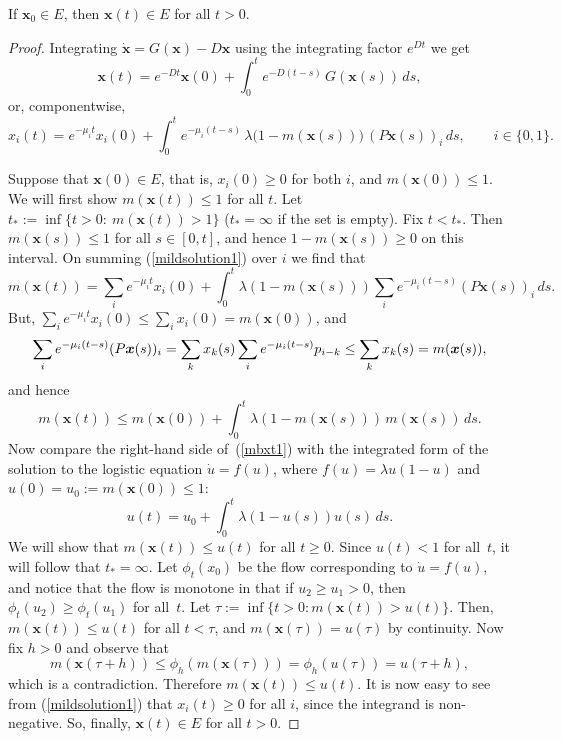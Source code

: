 \documentclass[10pt,a4paper]{amsart}
\newcommand{\bx}{\boldsymbol{x}}
\begin{document}
\begin{theorem}
If $\bx_0\in E$, then $\bx(t)\in E$ for all $t>0$.
\end{theorem}

\begin{proof}
Integrating $\dot{\bx}=G(\bx) - D\bx$ using the integrating factor
$e^{Dt}$ we get
$$
\bx(t)=e^{-D t}\bx(0)+\int_0^t e^{-D(t-s)}\,G(\bx(s))\,ds,
$$
or, componentwise,
\begin{equation}
x_i(t)=e^{-\mu_i t}x_i(0)+\int_0^t
e^{-\mu_i(t-s)}\,\lambda\bigl(1-m(\bx(s))\bigr)\, (P\bx(s))_i\,ds,
\qquad i\in \{0,1\}.
\label{mildsolution1}
\end{equation}

Suppose that $\bx(0)\in E$, that is, 
$x_i(0)\geq 0$ for both $i$, and $m(\bx(0))\leq 1$.
We will first show $m(\bx(t))\leq 1$ for all $t$.
Let $t_*:=\inf\{t>0:\ m(\bx(t))>1\}$ 
($t_*=\infty$ if the set is empty).
Fix $t<t_*$. Then $m(\bx(s))\le 1$ for all $s\in[0,t]$, and hence 
$1-m(\bx(s))\geq 0$ on this interval. 
On summing (\ref{mildsolution1}) over $i$ we find that 
\[
m(\bx(t))=\sum_i e^{-\mu_i t}x_i(0)
+\int_0^t \lambda(1-m(\bx(s)))\sum_i e^{-\mu_i(t-s)}(P\bx(s))_i\,ds.
\]
But, $\sum_i e^{-\mu_i t}x_i(0)\le \sum_i x_i(0)=m(\bx(0))$, and
$$
\sum_i e^{-\mu_i(t-s)}(P\bx(s))_i
=\sum_k x_k(s)\sum_i e^{-\mu_i(t-s)}p_{i-k}\\
\leq \sum_k x_k(s)=m(\bx(s)),
$$
and hence 
\begin{equation}
m(\bx(t))\le m(\bx(0))+\int_0^t \lambda(1-m(\bx(s)))\,m(\bx(s))\,ds.
\label{mbxt1}
\end{equation}
Now compare the right-hand side of~(\ref{mbxt1}) with the
integrated form of the solution to the
logistic equation $\dot{u}=f(u)$, where $f(u)=\lambda u(1-u)$ and 
$u(0)=u_0:=m(\bx(0))\le 1$:
$$
u(t) = u_0 + \int_0^t \lambda (1-u(s)) u(s)\, ds.
$$
We will show that $m(\bx(t))\leq u(t)$ for all $t\geq 0$. 
Since $u(t)<1$ for all~$t$, it will follow that $t_*=\infty$. 
Let $\phi_t(x_0)$ be the flow corresponding to $\dot{u}=f(u)$,
and notice that the flow is monotone in that if $u_2\geq u_1>0$,
then $\phi_t(u_2)\geq \phi_t(u_1)$ for all~$t$.
Let $\tau := \inf\{t>0 : m(\bx(t)) > u(t)\}$.
Then, $m(\bx(t))\leq u(t)$ for all $t<\tau$, and $m(\bx(\tau))=u(\tau)$
by continuity. Now fix $h>0$ and observe that
$$
m(\bx(\tau+h)) \leq \phi_h(m(\bx(\tau)))=\phi_h(u(\tau))= u(\tau+h),
$$
which is a contradiction. Therefore $m(\bx(t))\leq u(t)$.
It is now easy to see from (\ref{mildsolution1}) that $x_i(t)\geq 0$
for all $i$, since the integrand is non-negative.
So, finally, $\bx(t)\in E$ for all $t>0$.
\end{proof}
\end{document}
